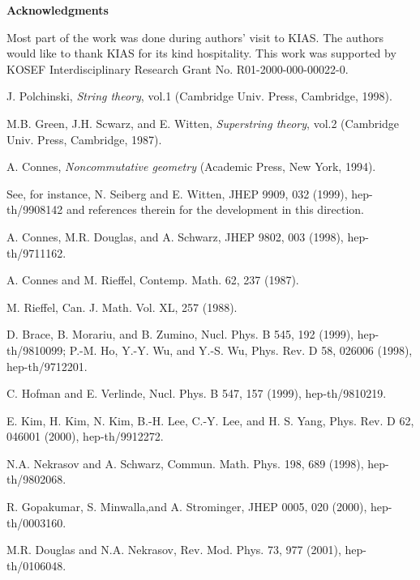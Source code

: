 \documentclass[12pt, a4paper]{article}
\begin{document}
\vspace{5mm}

\noindent
{\Large \bf Acknowledgments}

\vspace{5mm}
\noindent
Most part of the work was done during
authors' visit to KIAS. The authors would like to thank KIAS for
its kind hospitality. This work was supported by KOSEF
Interdisciplinary Research Grant No. R01-2000-000-00022-0.





\begin{thebibliography}{88}

 J. Polchinski, {\it String theory}, vol.1 (Cambridge
Univ. Press, Cambridge, 1998).

 M.B. Green, J.H. Scwarz, and E. Witten,
 {\it Superstring theory}, vol.2 (Cambridge Univ. Press, Cambridge, 1987).

 A. Connes, {\it Noncommutative geometry} (Academic Press, New York, 1994).

 See, for instance, N. Seiberg and E. Witten,
JHEP 9909,  032 (1999), hep-th/9908142 and references therein for
the development in this direction.

 A. Connes, M.R. Douglas, and A. Schwarz,
JHEP 9802, 003 (1998), hep-th/9711162.

 A. Connes and M. Rieffel,
Contemp. Math. 62,  237 (1987).

 M. Rieffel, Can. J. Math. Vol. XL, 257 (1988).

 D. Brace, B. Morariu, and B. Zumino,
Nucl. Phys. B 545, 192 (1999),  hep-th/9810099;
  P.-M. Ho, Y.-Y. Wu, and Y.-S. Wu,
Phys. Rev. D 58, 026006 (1998), hep-th/9712201.

 C. Hofman and E. Verlinde,
Nucl. Phys. B 547, 157 (1999), hep-th/9810219.

 E. Kim, H. Kim, N. Kim, B.-H. Lee, C.-Y. Lee, and H. S. Yang,
Phys. Rev. D 62, 046001 (2000),  hep-th/9912272.

 N.A. Nekrasov and A. Schwarz, Commun. Math. Phys. 198, 689 (1998), hep-th/9802068.

 R. Gopakumar, S. Minwalla,and A. Strominger, JHEP 0005, 020 (2000),
          hep-th/0003160.

 M.R. Douglas and N.A. Nekrasov, Rev. Mod. Phys. 73, 977 (2001), hep-th/0106048.


\end{thebibliography}
\end{document}
